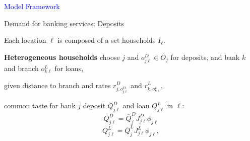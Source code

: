 \documentclass[notes,10pt, aspectratio=169]{beamer}
\newenvironment{wideitemize}{\itemize\addtolength{\itemsep}{10pt}}{\enditemize}
\begin{document}
    
        



\begin{frame}[noframenumbering]

\huge \centering \textcolor{blue}{Model Framework}

\end{frame}
    
\begin{frame}{Demand for banking services: Deposits}

    \begin{wideitemize}
        \item Each location $\ell$ is composed of a set households $I_{\ell}$.
        \item \textbf{Heterogeneous households} choose  $j$ and  $o^D_{j \ell} \in O_j$ for deposits, and 
 bank $k$ and branch $o^L_{k \ell}$ for loans,
        
        \item given distance to branch and rates $r_{j, o_{j \ell}^D}^D$ and $r_{k, o_{k \ell}^L}^L$,


        \item common taste for bank $j$ deposit $Q_{j \ell}^D$ and loan $Q_{j \ell}^L$ in $\ell$: 
\begin{equation}
Q_{j \ell}^D=\bar{Q}_j^D J_{j \ell}^D \phi_{j \ell}
\end{equation}
\begin{equation}
Q_{j \ell}^L=\bar{Q}_j^L J_{j \ell}^L \phi_{j \ell},
\end{equation}


\end{wideitemize}
\end{frame}
\end{document}
